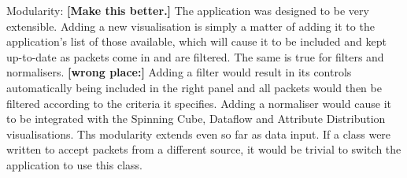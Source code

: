 Modularity: \textbf{[Make this better.]}
The application was designed to be very extensible.  Adding a new visualisation is simply a matter of adding it to the application's list of those available, which will cause it to be included and kept up-to-date as packets come in and are filtered.  The same is true for filters and normalisers.  \textbf{[wrong place:] }Adding a filter would result in its controls automatically being included in the right panel and all packets would then be filtered according to the criteria it specifies.  Adding a normaliser would cause it to be integrated with the Spinning Cube, Dataflow and Attribute Distribution visualisations.  Ths modularity extends even so far as data input.  If a class were written to accept packets from a different source, it would be trivial to switch the application to use this class.
